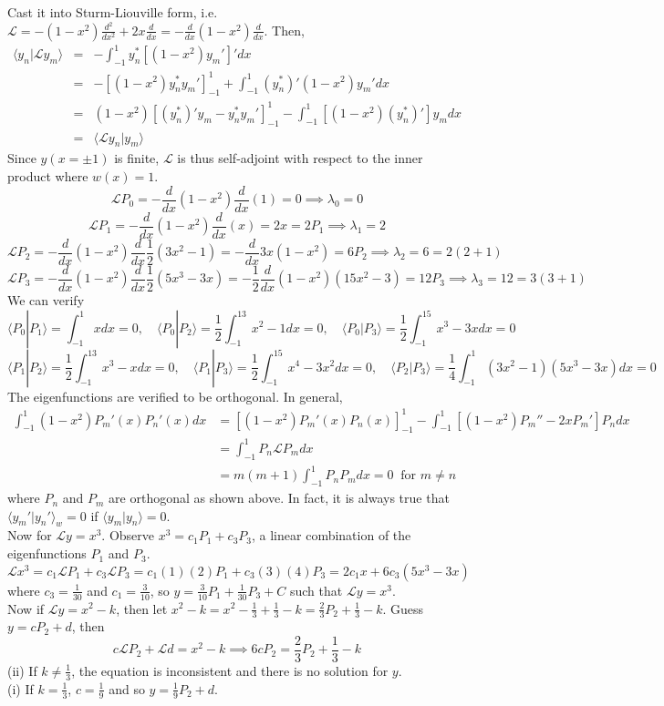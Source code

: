 \documentclass[a4paper]{article}
\begin{document}
\begin{ans}
Cast it into Sturm-Liouville form, i.e. $\mathcal{L}=-(1-x^2)\frac{d^2}{dx^2}+2x\frac{d}{dx}=-\frac{d}{dx}(1-x^2)\frac{d}{dx}$. Then,
\begin{eqnarray}
\langle y_n|\mathcal{L}y_m\rangle&=&-\int_{-1}^1y_n^*[(1-x^2)y_m']'dx\nonumber\\&=&-[(1-x^2)y_n^*y_m']_{-1}^1+\int_{-1}^1(y_n^*)'(1-x^2)y_m'dx\nonumber\\&=&(1-x^2)[(y_n^*)'y_m-y_n^*y_m']^1_{-1}-\int_{-1}^1[(1-x^2)(y_n^*)']y_mdx\nonumber\\&=&\langle\mathcal{L}y_n|y_m\rangle\nonumber
\end{eqnarray}
Since $y(x=\pm1)$ is finite, $\mathcal{L}$ is thus self-adjoint with respect to the inner product where $w(x)=1$.
$$\mathcal{L}P_0=-\frac{d}{dx}(1-x^2)\frac{d}{dx}(1)=0\implies\lambda_0=0$$
$$\mathcal{L}P_1=-\frac{d}{dx}(1-x^2)\frac{d}{dx}(x)=2x=2P_1\implies \lambda_1=2$$
$$\mathcal{L}P_2=-\frac{d}{dx}(1-x^2)\frac{d}{dx}\frac{1}{2}(3x^2-1)=-\frac{d}{dx}3x(1-x^2)=6P_2\implies\lambda_2=6=2(2+1)$$
$$\mathcal{L}P_3=-\frac{d}{dx}(1-x^2)\frac{d}{dx}\frac{1}{2}(5x^3-3x)=-\frac{1}{2}\frac{d}{dx}(1-x^2)(15x^2-3)=12 P_3\implies\lambda_3=12=3(3+1)$$
We can verify 
$$\langle P_0|P_1\rangle=\int_{-1}^1xdx=0,\quad\langle P_0|P_2\rangle=\frac{1}{2}\int_{-1}^13x^2-1dx=0,\quad\langle P_0|P_3\rangle=\frac{1}{2}\int_{-1}^15x^3-3xdx=0$$
$$\langle P_1|P_2\rangle=\frac{1}{2}\int_{-1}^13x^3-xdx=0,\quad\langle P_1|P_3\rangle=\frac{1}{2}\int_{-1}^15x^4-3x^2dx=0,\quad\langle P_2|P_3\rangle=\frac{1}{4}\int_{-1}^1(3x^2-1)(5x^3-3x)dx=0$$
The eigenfunctions are verified to be orthogonal. In general,
\begin{align}
\int_{-1}^1(1-x^2)P_m'(x)P_n'(x)dx&=[(1-x^2)P_m'(x)P_n(x)]_{-1}^1-\int_{-1}^1[(1-x^2)P_m''-2xP_m']P_ndx\nonumber\\&=\int_{-1}^1P_n\mathcal{L}P_mdx\nonumber\\&=m(m+1)\int_{-1}^1P_nP_mdx=0~\text{ for }m\neq n\nonumber
\end{align}
where $P_n$ and $P_m$ are orthogonal as shown above. In fact, it is always true that $\langle y_m'|y_n'\rangle_w=0$ if $\langle y_m|y_n\rangle=0$.\\[5pt] Now for $\mathcal{L}y=x^3$. Observe $x^3=c_1P_1+c_3P_3$, a linear combination of the eigenfunctions $P_1$ and $P_3$.
$$\mathcal{L} x^3=c_1\mathcal{L}P_1+c_3\mathcal{L}P_3=c_1(1)(2)P_1+c_3(3)(4)P_3=2c_1x+6c_3(5x^3-3x)$$
where $c_3=\frac{1}{30}$ and $c_1=\frac{3}{10}$, so $y=\frac{3}{10}P_1+\frac{1}{30}P_3+C$ such that $\mathcal{L}y=x^3$.\\[5pt]
Now if $\mathcal{L}y=x^2-k$, then let $x^2-k=x^2-\frac{1}{3}+\frac{1}{3}-k=\frac{2}{3}P_2+\frac{1}{3}-k$. Guess $y=cP_2+d$, then
$$c\mathcal{L}P_2+\mathcal{L}d=x^2-k\implies 6cP_2=\frac{2}{3}P_2+\frac{1}{3}-k$$
(ii) If $k\neq\frac{1}{3}$, the equation is inconsistent and there is no solution for $y$.\\[5pt]
(i) If $k=\frac{1}{3}$, $c=\frac{1}{9}$ and so $y=\frac{1}{9}P_2+d$.
\end{ans}
\end{document}
